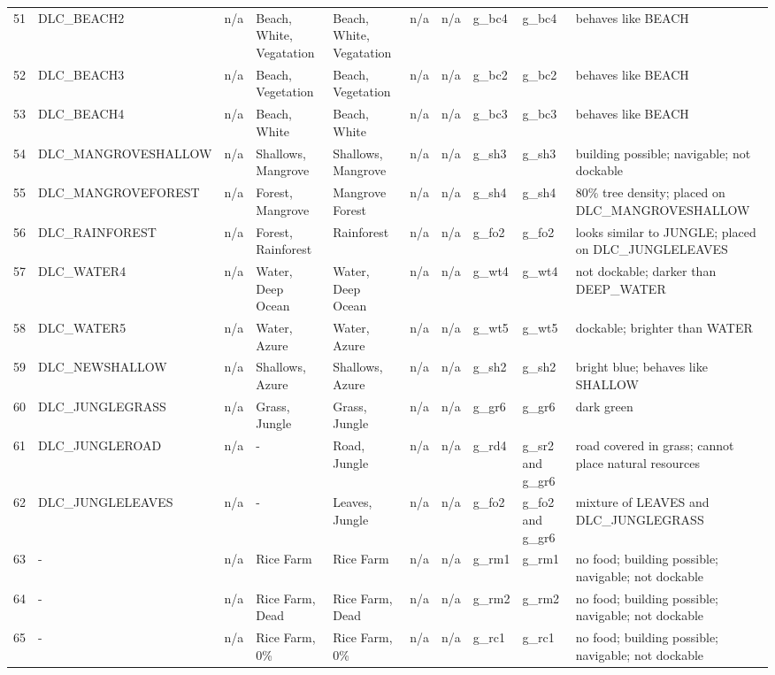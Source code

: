 \begin{appendices}
\begin{landscape}
\begin{longtable}{@{}p{5mm}|p{25mm}p{23mm}|p{14mm}p{14mm}p{14mm}p{14mm}|p{10mm}p{15mm}|p{45mm}@{}}
            51	& DLC\_BEACH2	& n/a	& Beach, White, Vegatation	& Beach, White, Vegatation	& n/a	& n/a	& g\_bc4	& g\_bc4		& behaves like BEACH \\
            52	& DLC\_BEACH3	& n/a	& Beach, Vegetation	& Beach, Vegetation	& n/a	& n/a	& g\_bc2	& g\_bc2		& behaves like BEACH \\
            53	& DLC\_BEACH4	& n/a	& Beach, White	& Beach, White	& n/a	& n/a	& g\_bc3	& g\_bc3		& behaves like BEACH \\
            54	& DLC\_MANGROVESHALLOW	& n/a	& Shallows, Mangrove	& Shallows, Mangrove	& n/a	& n/a	& g\_sh3	& g\_sh3		& building possible; navigable; not dockable \\
            55	& DLC\_MANGROVEFOREST	& n/a	& Forest, Mangrove	& Mangrove Forest	& n/a	& n/a	& g\_sh4	& g\_sh4		& 80\% tree density; placed on DLC\_MANGROVESHALLOW \\
            56	& DLC\_RAINFOREST	& n/a	& Forest, Rainforest	& Rainforest	& n/a	& n/a	& g\_fo2	& g\_fo2		& looks similar to JUNGLE; placed on DLC\_JUNGLELEAVES \\
            57	& DLC\_WATER4	& n/a	& Water, Deep Ocean	& Water, Deep Ocean	& n/a	& n/a	& g\_wt4	& g\_wt4		& not dockable; darker than DEEP\_WATER \\
            58	& DLC\_WATER5	& n/a	& Water, Azure	& Water, Azure	& n/a	& n/a	& g\_wt5	& g\_wt5		& dockable; brighter than WATER \\
            59	& DLC\_NEWSHALLOW	& n/a	& Shallows, Azure	& Shallows, Azure	& n/a	& n/a	& g\_sh2	& g\_sh2		& bright blue; behaves like SHALLOW \\
            60	& DLC\_JUNGLEGRASS	& n/a	& Grass, Jungle	& Grass, Jungle	& n/a	& n/a	& g\_gr6	& g\_gr6		& dark green \\
            61	& DLC\_JUNGLEROAD	& n/a	& -	& Road, Jungle	& n/a	& n/a	& g\_rd4	& g\_sr2 and g\_gr6		& road covered in grass; cannot place natural resources \\
            62	& DLC\_JUNGLELEAVES	& n/a	& -	& Leaves, Jungle	& n/a	& n/a	& g\_fo2	& g\_fo2 and g\_gr6		& mixture of LEAVES and DLC\_JUNGLEGRASS \\
            63	& -	& n/a	& Rice Farm	& Rice Farm	& n/a	& n/a	& g\_rm1	& g\_rm1		& no food; building possible; navigable; not dockable \\
            64	& -	& n/a	& Rice Farm, Dead	& Rice Farm, Dead	& n/a	& n/a	& g\_rm2	& g\_rm2		& no food; building possible; navigable; not dockable \\
            65	& -	& n/a	& Rice Farm, 0\%	& Rice Farm, 0\%	& n/a	& n/a	& g\_rc1	& g\_rc1		& no food; building possible; navigable; not dockable \\

\end{longtable}
\end{landscape}
\end{appendices}
